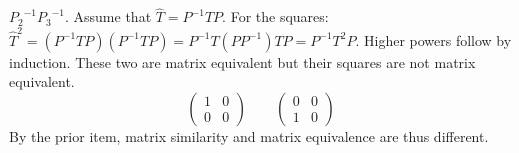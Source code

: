 \begin{exercises}
\begin{answer}
\begin{exparts}
          \( {P_2}^{-1}{P_3}^{-1} \).
        \partsitem Assume  that \( \hat{T}=P^{-1}TP \).
          For the squares:
          \( \hat{T}^2=(P^{-1}TP)(P^{-1}TP)
                      =P^{-1}T(PP^{-1})TP=P^{-1}T^2P \).
          Higher powers follow by induction.
        \partsitem These two are matrix equivalent but their squares are not
          matrix equivalent.
          \begin{equation*}
             \begin{pmatrix}
               1  &0  \\
               0  &0
             \end{pmatrix}
             \qquad
             \begin{pmatrix}
               0  &0  \\
               1  &0
             \end{pmatrix}
          \end{equation*}
          By the prior item, matrix similarity and matrix equivalence are thus
          different.
      \end{exparts}  
   \end{answer}
\end{exercises}
